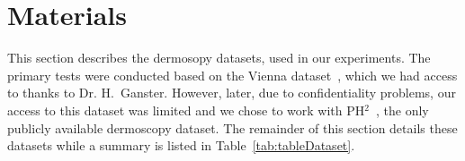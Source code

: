 \section{Materials}
\label{sec:chp3-sec3}
This section describes the dermosopy datasets, used in our experiments.
The primary tests were conducted based on the Vienna dataset~\cite{ganster2001automated}, which we had access to thanks to Dr. H.~Ganster.
However, later, due to confidentiality problems, our access to this dataset was limited and we chose to work with PH$^{2}$~\cite{mendoncca2013ph}, the only publicly available dermoscopy dataset.
The remainder of this section details these datasets while a summary is listed in Table~\ref{tab:tableDataset}.


\begin{table}[H]
\caption{Summary of Vienna and PH$^{2}$ Datasets. M, D, and B stand for melanoma, dysplastic and benign samples, respectively.}
\centering
{}
\label{tab:tableDataset}
\end{table}


